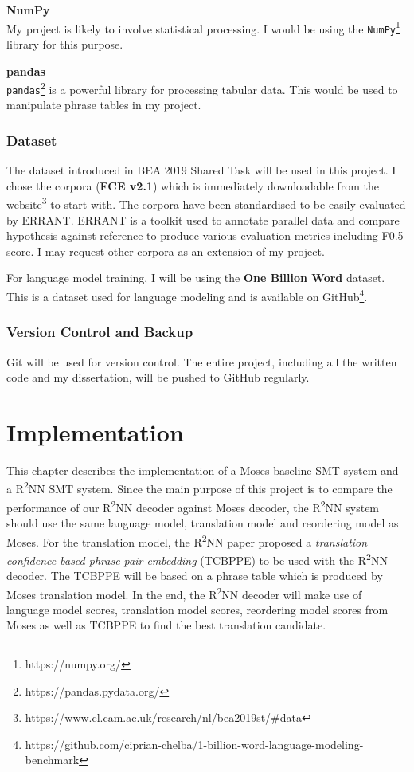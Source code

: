 \documentclass[12pt,a4paper,twoside,openright]{report}
\begin{document}
\textbf{NumPy} \\
My project is likely to involve statistical processing. I would be using the \texttt{NumPy}\footnote{https://numpy.org/} library for this purpose.

\textbf{pandas} \\
\texttt{pandas}\footnote{https://pandas.pydata.org/} is a powerful library for processing tabular data. This would be used to manipulate phrase tables in my project.

\subsection{Dataset}
The dataset introduced in BEA 2019 Shared Task\cite{bryant-etal-2019-bea} will be used in this project. I chose the corpora (\textbf{FCE v2.1}) which is immediately downloadable from the website\footnote{https://www.cl.cam.ac.uk/research/nl/bea2019st/\#data} to start with. The corpora have been standardised to be easily evaluated by ERRANT\cite{bryant-etal-2017-automatic,felice-etal-2016-automatic}. ERRANT is a toolkit used to annotate parallel data and compare hypothesis against reference to produce various evaluation metrics including F0.5 score. I may request other corpora as an extension of my project.

For language model training, I will be using the \textbf{One Billion Word} dataset\cite{one-billion-word}. This is a dataset used for language modeling and is available on GitHub\footnote{https://github.com/ciprian-chelba/1-billion-word-language-modeling-benchmark}.

\subsection{Version Control and Backup}
Git will be used for version control. The entire project, including all the written code and my dissertation, will be pushed to GitHub regularly.

\chapter{Implementation}
This chapter describes the implementation of a Moses baseline SMT system and a R\textsuperscript{2}NN SMT system. Since the main purpose of this project is to compare the performance of our R\textsuperscript{2}NN decoder against Moses decoder, the R\textsuperscript{2}NN system should use the same language model, translation model and reordering model as Moses. For the translation model, the R\textsuperscript{2}NN paper\cite{r2nn} proposed a \textit{translation confidence based phrase pair embedding} (TCBPPE) to be used with the R\textsuperscript{2}NN decoder. The TCBPPE will be based on a phrase table which is produced by Moses translation model. In the end, the R\textsuperscript{2}NN decoder will make use of language model scores, translation model scores, reordering model scores from Moses as well as TCBPPE to find the best translation candidate.
\end{document}

